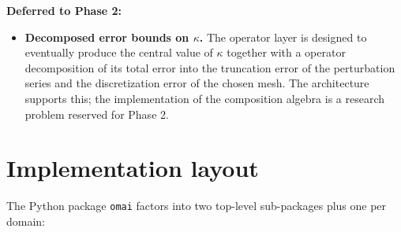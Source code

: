 \documentclass[11pt,a4paper]{article}
\begin{document}
\noindent\textbf{Deferred to Phase 2:}
\begin{itemize}[leftmargin=2em]
  \item \textbf{Decomposed error bounds on $\kappa$.} The operator layer is designed to eventually
        produce the central value of $\kappa$ together with a operator decomposition of its
        total error into the truncation error of the perturbation series and the discretization
        error of the chosen mesh. The architecture supports this; the implementation of the
        composition algebra is a research problem reserved for Phase 2.
\end{itemize}

\section{Implementation layout}
\label{sec:layout}

The Python package \texttt{omai} factors into two top-level sub-packages
plus one per domain:
\end{document}
